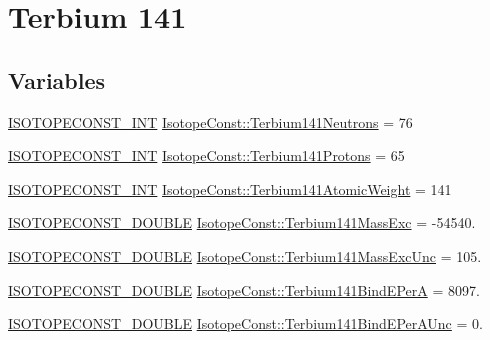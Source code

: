 \hypertarget{group___isotope_const-_terbium-_tb141}{}\section{Terbium 141}
\label{group___isotope_const-_terbium-_tb141}
\subsection*{Variables}
\begin{DoxyCompactItemize}
\item 
\mbox{\hyperlink{group___isotope_const-_macros_ga5f18360b3e99483a35c32d789e62621c}{I\+S\+O\+T\+O\+P\+E\+C\+O\+N\+S\+T\+\_\+\+I\+NT}} \mbox{\hyperlink{group___isotope_const-_terbium-_tb141_gac15ce169569eae0de0e402cd1c848fcf}{Isotope\+Const\+::\+Terbium141\+Neutrons}} = 76
\item 
\mbox{\hyperlink{group___isotope_const-_macros_ga5f18360b3e99483a35c32d789e62621c}{I\+S\+O\+T\+O\+P\+E\+C\+O\+N\+S\+T\+\_\+\+I\+NT}} \mbox{\hyperlink{group___isotope_const-_terbium-_tb141_ga9a3c1a3585a3cd7c69512f763fd9c4d3}{Isotope\+Const\+::\+Terbium141\+Protons}} = 65
\item 
\mbox{\hyperlink{group___isotope_const-_macros_ga5f18360b3e99483a35c32d789e62621c}{I\+S\+O\+T\+O\+P\+E\+C\+O\+N\+S\+T\+\_\+\+I\+NT}} \mbox{\hyperlink{group___isotope_const-_terbium-_tb141_ga27b17b9c836739e4ce11c4e736322fbd}{Isotope\+Const\+::\+Terbium141\+Atomic\+Weight}} = 141
\item 
\mbox{\hyperlink{group___isotope_const-_macros_ga8f45a7272ce02c0b4c65c44636ed719a}{I\+S\+O\+T\+O\+P\+E\+C\+O\+N\+S\+T\+\_\+\+D\+O\+U\+B\+LE}} \mbox{\hyperlink{group___isotope_const-_terbium-_tb141_gad7102b27ee67287bea20c4fb49e7e2db}{Isotope\+Const\+::\+Terbium141\+Mass\+Exc}} = -\/54540.
\item 
\mbox{\hyperlink{group___isotope_const-_macros_ga8f45a7272ce02c0b4c65c44636ed719a}{I\+S\+O\+T\+O\+P\+E\+C\+O\+N\+S\+T\+\_\+\+D\+O\+U\+B\+LE}} \mbox{\hyperlink{group___isotope_const-_terbium-_tb141_ga40fa51a783046f7f925813c83ce3eb2d}{Isotope\+Const\+::\+Terbium141\+Mass\+Exc\+Unc}} = 105.
\item 
\mbox{\hyperlink{group___isotope_const-_macros_ga8f45a7272ce02c0b4c65c44636ed719a}{I\+S\+O\+T\+O\+P\+E\+C\+O\+N\+S\+T\+\_\+\+D\+O\+U\+B\+LE}} \mbox{\hyperlink{group___isotope_const-_terbium-_tb141_ga3621d5b0a4b19a956bd3a509378687c8}{Isotope\+Const\+::\+Terbium141\+Bind\+E\+PerA}} = 8097.
\item 
\mbox{\hyperlink{group___isotope_const-_macros_ga8f45a7272ce02c0b4c65c44636ed719a}{I\+S\+O\+T\+O\+P\+E\+C\+O\+N\+S\+T\+\_\+\+D\+O\+U\+B\+LE}} \mbox{\hyperlink{group___isotope_const-_terbium-_tb141_gaa2d5f8db5725ea6501514c5186809a69}{Isotope\+Const\+::\+Terbium141\+Bind\+E\+Per\+A\+Unc}} = 0.

\end{DoxyCompactItemize}
